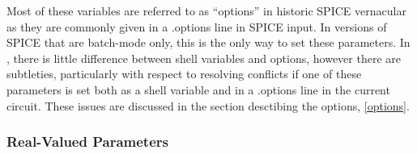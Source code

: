 Most of these variables are referred to as ``options'' in historic
SPICE vernacular as they are commonly given in a {\vt .options} line
in SPICE input.  In versions of SPICE that are batch-mode only, this
is the only way to set these parameters.  In {\WRspice}, there is
little difference between shell variables and options, however there
are subtleties, particularly with respect to resolving conflicts if
one of these parameters is set both as a shell variable and in a {\vt
.options} line in the current circuit.  These issues are discussed in
the section desctibing the options, \ref{options}. 
 
\subsubsection{Real-Valued Parameters}

